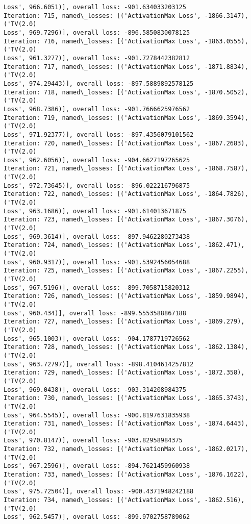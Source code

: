 \documentclass[10pt]{article}
\begin{document}
\begin{Verbatim}[commandchars=\\\{\}]
Loss', 966.6051)], overall loss: -901.634033203125
Iteration: 715, named\_losses: [('ActivationMax Loss', -1866.3147), ('TV(2.0)
Loss', 969.7296)], overall loss: -896.5850830078125
Iteration: 716, named\_losses: [('ActivationMax Loss', -1863.0555), ('TV(2.0)
Loss', 961.3277)], overall loss: -901.7278442382812
Iteration: 717, named\_losses: [('ActivationMax Loss', -1871.8834), ('TV(2.0)
Loss', 974.29443)], overall loss: -897.5889892578125
Iteration: 718, named\_losses: [('ActivationMax Loss', -1870.5052), ('TV(2.0)
Loss', 968.7386)], overall loss: -901.7666625976562
Iteration: 719, named\_losses: [('ActivationMax Loss', -1869.3594), ('TV(2.0)
Loss', 971.92377)], overall loss: -897.4356079101562
Iteration: 720, named\_losses: [('ActivationMax Loss', -1867.2683), ('TV(2.0)
Loss', 962.6056)], overall loss: -904.6627197265625
Iteration: 721, named\_losses: [('ActivationMax Loss', -1868.7587), ('TV(2.0)
Loss', 972.73645)], overall loss: -896.022216796875
Iteration: 722, named\_losses: [('ActivationMax Loss', -1864.7826), ('TV(2.0)
Loss', 963.1686)], overall loss: -901.614013671875
Iteration: 723, named\_losses: [('ActivationMax Loss', -1867.3076), ('TV(2.0)
Loss', 969.3614)], overall loss: -897.9462280273438
Iteration: 724, named\_losses: [('ActivationMax Loss', -1862.471), ('TV(2.0)
Loss', 960.9317)], overall loss: -901.5392456054688
Iteration: 725, named\_losses: [('ActivationMax Loss', -1867.2255), ('TV(2.0)
Loss', 967.5196)], overall loss: -899.7058715820312
Iteration: 726, named\_losses: [('ActivationMax Loss', -1859.9894), ('TV(2.0)
Loss', 960.434)], overall loss: -899.5553588867188
Iteration: 727, named\_losses: [('ActivationMax Loss', -1869.279), ('TV(2.0)
Loss', 965.1003)], overall loss: -904.1787719726562
Iteration: 728, named\_losses: [('ActivationMax Loss', -1862.1384), ('TV(2.0)
Loss', 963.72797)], overall loss: -898.4104614257812
Iteration: 729, named\_losses: [('ActivationMax Loss', -1872.358), ('TV(2.0)
Loss', 969.0438)], overall loss: -903.314208984375
Iteration: 730, named\_losses: [('ActivationMax Loss', -1865.3743), ('TV(2.0)
Loss', 964.5545)], overall loss: -900.8197631835938
Iteration: 731, named\_losses: [('ActivationMax Loss', -1874.6443), ('TV(2.0)
Loss', 970.8147)], overall loss: -903.82958984375
Iteration: 732, named\_losses: [('ActivationMax Loss', -1862.0217), ('TV(2.0)
Loss', 967.2596)], overall loss: -894.7621459960938
Iteration: 733, named\_losses: [('ActivationMax Loss', -1876.1622), ('TV(2.0)
Loss', 975.72504)], overall loss: -900.4371948242188
Iteration: 734, named\_losses: [('ActivationMax Loss', -1862.516), ('TV(2.0)
Loss', 962.5457)], overall loss: -899.9702758789062

\end{Verbatim}
\end{document}
